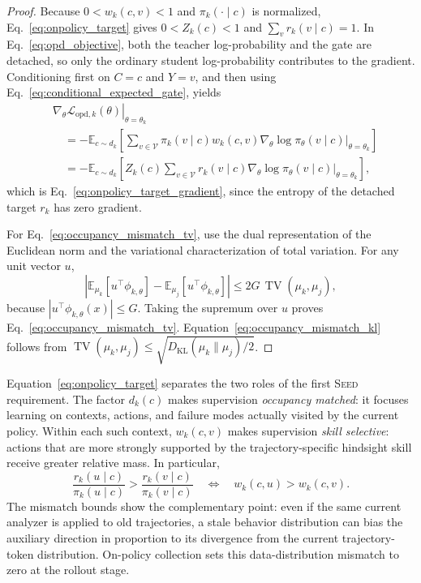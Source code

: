 \begin{proof}
Because $0<w_k(c,v)<1$ and $\pi_k(\cdot\mid c)$ is normalized, Eq.~\ref{eq:onpolicy_target} gives $0<Z_k(c)<1$ and $\sum_v r_k(v\mid c)=1$. In Eq.~\ref{eq:opd_objective}, both the teacher log-probability and the gate are detached, so only the ordinary student log-probability contributes to the gradient. Conditioning first on $C=c$ and $Y=v$, and then using Eq.~\ref{eq:conditional_expected_gate}, yields
\begin{align*}
 &\left.
 \nabla_\theta\mathcal L_{\mathrm{opd},k}(\theta)
 \right|_{\theta=\theta_k}
 \\
 &\quad=
 -\mathbb E_{c\sim d_k}
 \left[
 \sum_{v\in\mathcal V}
 \pi_k(v\mid c)w_k(c,v)
 \left.
 \nabla_\theta\log\pi_\theta(v\mid c)
 \right|_{\theta=\theta_k}
 \right]
 \\
 &\quad=
 -\mathbb E_{c\sim d_k}
 \left[
 Z_k(c)
 \sum_{v\in\mathcal V}
 r_k(v\mid c)
 \left.
 \nabla_\theta\log\pi_\theta(v\mid c)
 \right|_{\theta=\theta_k}
 \right],
\end{align*}
which is Eq.~\ref{eq:onpolicy_target_gradient}, since the entropy of the detached target $r_k$ has zero gradient.

For Eq.~\ref{eq:occupancy_mismatch_tv}, use the dual representation of the Euclidean norm and the variational characterization of total variation. For any unit vector $u$,
\[
 \left|
 \mathbb E_{\mu_k}[u^\top\phi_{k,\theta}]
 -
 \mathbb E_{\mu_j}[u^\top\phi_{k,\theta}]
 \right|
 \le
 2G\,\operatorname{TV}(\mu_k,\mu_j),
\]
because $|u^\top\phi_{k,\theta}(x)|\le G$. Taking the supremum over $u$ proves Eq.~\ref{eq:occupancy_mismatch_tv}. Equation~\ref{eq:occupancy_mismatch_kl} follows from
$\operatorname{TV}(\mu_k,\mu_j)\le\sqrt{D_{\mathrm{KL}}(\mu_k\|\mu_j)/2}$.
\end{proof}

Equation~\ref{eq:onpolicy_target} separates the two roles of the first \textsc{Seed} requirement. The factor $d_k(c)$ makes supervision \emph{occupancy matched}: it focuses learning on contexts, actions, and failure modes actually visited by the current policy. Within each such context, $w_k(c,v)$ makes supervision \emph{skill selective}: actions that are more strongly supported by the trajectory-specific hindsight skill receive greater relative mass. In particular,
\[
 \frac{r_k(u\mid c)}{\pi_k(u\mid c)}
 >
 \frac{r_k(v\mid c)}{\pi_k(v\mid c)}
 \quad\Longleftrightarrow\quad
 w_k(c,u)>w_k(c,v).
\]
The mismatch bounds show the complementary point: even if the same current analyzer is applied to old trajectories, a stale behavior distribution can bias the auxiliary direction in proportion to its divergence from the current trajectory-token distribution. On-policy collection sets this data-distribution mismatch to zero at the rollout stage.

